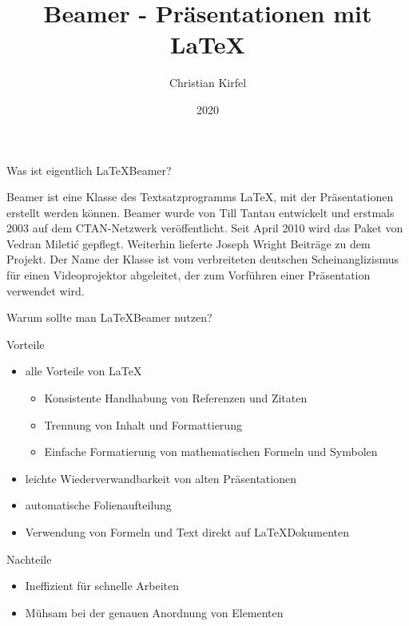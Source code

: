 \documentclass{beamer}
\title{Beamer - Präsentationen mit \LaTeX}
\author{Christian Kirfel}
\institute{Physikalisches Institut Bonn}
\date{2020}
\begin{document}
\frame{\titlepage}


\begin{frame}{Was ist eigentlich \LaTeX Beamer?}
    \begin{center}
        Beamer ist eine Klasse des Textsatzprogramms LaTeX, mit der Präsentationen erstellt werden können.
        Beamer wurde von Till Tantau entwickelt und erstmals 2003 auf dem CTAN-Netzwerk veröffentlicht.
        Seit April 2010 wird das Paket von Vedran Miletić gepflegt. Weiterhin lieferte Joseph Wright Beiträge zu dem Projekt.
        Der Name der Klasse ist vom verbreiteten deutschen Scheinanglizismus für einen Videoprojektor abgeleitet, der zum Vorführen einer Präsentation verwendet wird.\cite{wiki:beamer}
    \end{center}
\end{frame}

\begin{frame}{Warum sollte man \LaTeX Beamer nutzen?}
    \begin{block}{Vorteile}
        \begin{itemize}
            \item alle Vorteile von \LaTeX
                \begin{itemize}
                    \item Konsistente Handhabung von Referenzen und Zitaten
                    \item Trennung von Inhalt und Formattierung 
                    \item Einfache Formatierung von mathematischen Formeln und Symbolen
                \end{itemize}
            \item leichte Wiederverwandbarkeit von alten Präsentationen
            \item automatische Folienaufteilung
            \item Verwendung von Formeln und Text direkt auf \LaTeX Dokumenten
        \end{itemize}
    \end{block}
    \begin{block}{Nachteile}
        \begin{itemize}
            \item Ineffizient für schnelle Arbeiten
            \item Mühsam bei der genauen Anordnung von Elementen
        \end{itemize}
    \end{block}
\end{frame}
\end{document}

